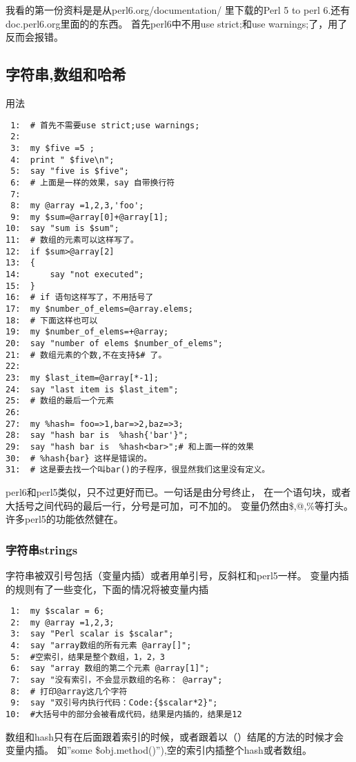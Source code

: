 \documentclass{ctexart}
\begin{document}
我看的第一份资料是是从perl6.org/documentation/ 里下载的Perl 5 to 
perl 6.还有doc.perl6.org里面的的东西。
首先perl6中不用use strict;和use warnings;了，用了反而会报错。
\subsection{字符串,数组和哈希}
\label{sec-4-1}

用法

\begin{lstlisting}
 1:  # 首先不需要use strict;use warnings;
 2:  
 3:  my $five =5 ;
 4:  print " $five\n";
 5:  say "five is $five";
 6:  # 上面是一样的效果，say 自带换行符
 7:  
 8:  my @array =1,2,3,'foo';
 9:  my $sum=@array[0]+@array[1];
10:  say "sum is $sum";
11:  # 数组的元素可以这样写了。
12:  if $sum>@array[2]
13:  {
14:      say "not executed";
15:  }
16:  # if 语句这样写了，不用括号了
17:  my $number_of_elems=@array.elems;        
18:  # 下面这样也可以
19:  my $number_of_elems=+@array;
20:  say "number of elems $number_of_elems";
21:  # 数组元素的个数,不在支持$# 了。
22:  
23:  my $last_item=@array[*-1];
24:  say "last item is $last_item";
25:  # 数组的最后一个元素
26:  
27:  my %hash= foo=>1,bar=>2,baz=>3;
28:  say "hash bar is  %hash{'bar'}";
29:  say "hash bar is  %hash<bar>";# 和上面一样的效果
30:  # %hash{bar} 这样是错误的。
31:  # 这是要去找一个叫bar()的子程序，很显然我们这里没有定义。
\end{lstlisting}
perl6和perl5类似，只不过更好而已。一句话是由分号终止，
在一个语句块，或者大括号之间代码的最后一行，分号是可加，可不加的。
变量仍然由\$,@,\%等打头。许多perl5的功能依然健在。
\subsubsection{字符串strings}
\label{sec-4-1-1}

字符串被双引号包括（变量内插）或者用单引号，反斜杠和perl5一样。
变量内插的规则有了一些变化，下面的情况将被变量内插

\begin{lstlisting}
 1:  my $scalar = 6;
 2:  my @array =1,2,3;
 3:  say "Perl scalar is $scalar";
 4:  say "array数组的所有元素 @array[]";       
 5:  #空索引，结果是整个数组，1，2，3
 6:  say "array 数组的第二个元素 @array[1]";
 7:  say "没有索引，不会显示数组的名称： @array"; 
 8:  # 打印@array这几个字符
 9:  say "双引号内执行代码：Code:{$scalar*2}";  
10:  #大括号中的部分会被看成代码，结果是内插的，结果是12
\end{lstlisting}
数组和hash只有在后面跟着索引的时候，或者跟着以（）结尾的方法的时候才会变量内插。
如”some \$obj.method()''),空的索引内插整个hash或者数组。
\end{document}
